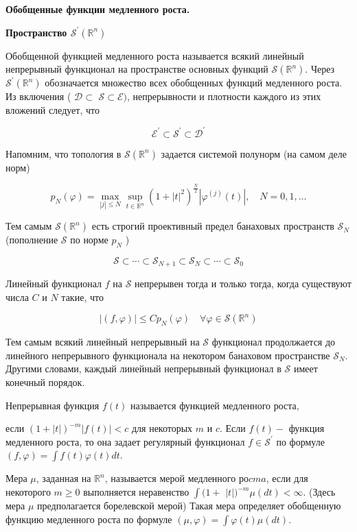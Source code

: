 \centerline{\bf \Huge Обобщенные функции медленного роста.}


\centerline{\bf \Huge Пространство $\mathcal{S}^{\prime}\left(\mathbb{R}^n\right)$}

Обобщенной функцией медленного роста называется всякий линейный непрерывный функционал на пространстве основных функций $\mathcal{S}\left(\mathbb{R}^n\right)$. Через $\mathcal{S}^{\prime}\left(\mathbb{R}^n\right)$ обозначается множество всех обобщенных функций медленного роста. Из включения ( $\mathcal{D} \subset$ $\mathcal{S} \subset \mathcal{E})$, непрерывности и плотности каждого из этих вложений следует, что

$$
\mathcal{E}^{\prime} \subset \mathcal{S}^{\prime} \subset \mathcal{D}^{\prime}
$$


Напомним, что топология в $\mathcal{S}\left(\mathbb{R}^n\right)$ задается системой полунорм (на самом деле норм)

$$
p_N(\varphi)=\max _{|j| \leqslant N} \sup _{t \in \mathbb{R}^n}\left(1+|t|^2\right)^{\frac{N}{2}}\left|\varphi^{(j)}(t)\right|, \quad N=0,1, \ldots
$$


Тем самым $\mathcal{S}\left(\mathbb{R}^n\right)$ есть строгий проективный предел банаховых пространств $\mathcal{S}_N$ (пополнение $\mathcal{S}$ по норме $p_N$ )

$$
\mathcal{S} \subset \cdots \subset \mathcal{S}_{N+1} \subset \mathcal{S}_N \subset \cdots \subset \mathcal{S}_0
$$


Линейный функционал $f$ на $\mathcal{S}$ непрерывен тогда и только тогда, когда существуют числа $C$ и $N$ такие, что

$$
|(f, \varphi)| \leqslant C p_N(\varphi) \quad \forall \varphi \in \mathcal{S}\left(\mathbb{R}^n\right)
$$

Тем самым всякий линейный непрерывный на $\mathcal{S}$ функционал продолжается до линейного непрерывного функционала на некотором банаховом пространстве $\mathcal{S}_N$. Другими словами, каждый линейный непрерывный функционал в $\mathcal{S}$ имеет конечный порядок.

Непрерывная функция $f(t)$ называется функцией медленного роста, 

если $(1+|t|)^{-m}|f(t)|<c$ для некоторых $m$ и $c$. Если $f(t)-$ функция медленного роста, то она задает регулярный функционал $f \in \mathcal{S}^{\prime}$ по формуле $(f, \varphi)=\int f(t) \varphi(t) d t$.

Мера $\mu$, заданная на $\mathbb{R}^n$, называется мерой медленного ро$c m a$, если для некоторого $m \geqslant 0$ выполняется неравенство $\int(1+$ $|t|)^{-m} \mu(d t)<\infty$. (Здесь мера $\mu$ предполагается борелевской мерой) Такая мера определяет обобщенную функцию медленного роста по формуле $(\mu, \varphi)=\int \varphi(t) \mu(d t)$.

